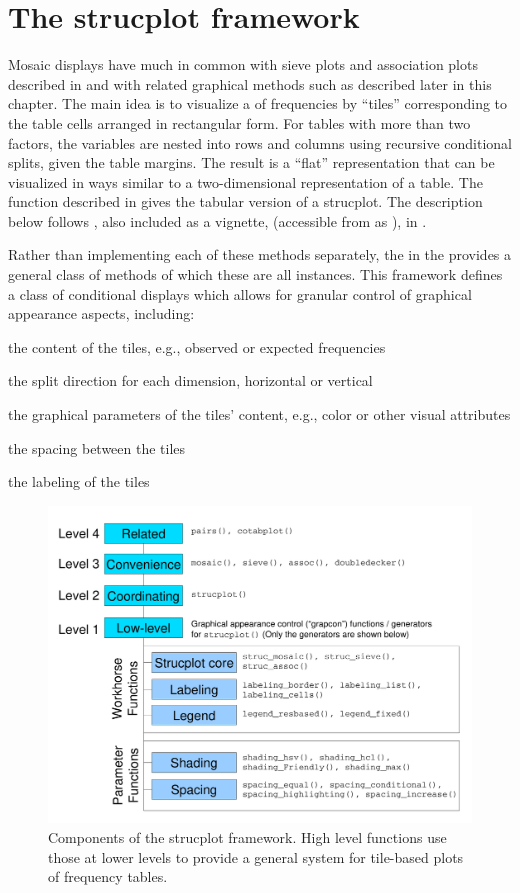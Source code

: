 \documentclass[11pt]{book}\usepackage[]{graphicx}\usepackage[]{color}
\begin{document}
\section{The strucplot framework}\label{sec:mosaic-strucplot}
Mosaic displays have much in common with sieve plots and association plots
described in  and with related graphical methods
such as  described later in this chapter.
The main idea is to visualize a \ctab of frequencies by ``tiles'' corresponding
to the table cells arranged in rectangular form. 
For \mway tables with more than two factors,
the variables are nested into rows and columns using recursive
conditional splits, given the table margins. The result is a
``flat'' representation that can be visualized in
ways similar to a two-dimensional representation of a table. 
The  function described in  gives the tabular
version of a strucplot.  The description below follows \citet{MeyerZeileisHornik:2006}, also
included as a vignette, 
(accessible from \R as ), in .

Rather than implementing each of these methods separately, the
 in the  provides a 
general class of methods of which these are all instances.
This framework defines a class of conditional displays which allows
for granular control of graphical appearance aspects, including:

\begin{itemize*}
\item the content of the tiles, e.g., observed or expected frequencies
\item the split direction for each dimension, horizontal or vertical
\item the graphical parameters of the tiles' content, e.g., color or other visual attributes
\item the spacing between the tiles
\item the labeling of the tiles
\end{itemize*}

\begin{figure}
\includegraphics[width=.8\textwidth]{ch05/fig/struc}
\caption{Components of the strucplot framework. High level functions use those at lower levels to provide a general system for tile-based plots of frequency tables.}
\label{fig:struc}
\end{figure}
\end{document}
